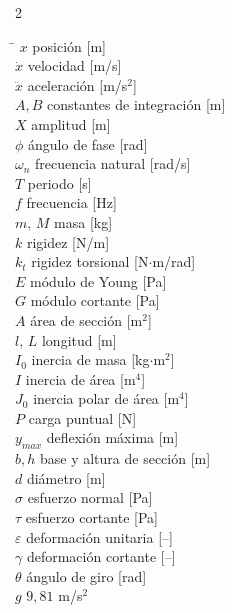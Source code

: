\documentclass[10pt,a4paper]{article}
\begin{document}
\begin{multicols}{2}
\begin{tabbing}
\hspace{1.3cm}\=\kill
$x$ \> posición [m] \\
$\dot{x}$ \> velocidad [m/s] \\
$\ddot{x}$ \> aceleración [m/s$^2$] \\
$A,B$ \> constantes de integración [m] \\
$X$ \> amplitud [m] \\
$\phi$ \> ángulo de fase [rad] \\
$\omega_n$ \> frecuencia natural [rad/s] \\
$T$ \> periodo [s] \\
$f$ \> frecuencia [Hz] \\
$m,\,M$ \> masa [kg] \\
$k$ \> rigidez [N/m] \\
$k_t$ \> rigidez torsional [N$\cdot$m/rad] \\
$E$ \> módulo de Young [Pa] \\
$G$ \> módulo cortante [Pa] \\
$A$ \> área de sección [m$^2$] \\
$l,\,L$ \> longitud [m] \\
$I_0$ \> inercia de masa [kg$\cdot$m$^2$] \\
$I$ \> inercia de área [m$^4$] \\
$J_0$ \> inercia polar de área [m$^4$] \\
$P$ \> carga puntual [N] \\
$y_{max}$ \> deflexión máxima [m] \\
$b,h$ \> base y altura de sección [m] \\
$d$ \> diámetro [m] \\
$\sigma$ \> esfuerzo normal [Pa] \\
$\tau$ \> esfuerzo cortante [Pa] \\
$\varepsilon$ \> deformación unitaria [--] \\
$\gamma$ \> deformación cortante [--] \\
$\theta$ \> ángulo de giro [rad] \\
$g$ \> $9{,}81$ m/s$^2$ \\
\end{tabbing}

\end{multicols}
\end{document}
